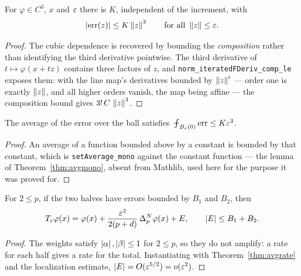\begin{theorem}\label{thm:cubicrate}
\leanok
For $\varphi \in C^3$, $x$ and $\varepsilon$ there is $K$, independent of the
increment, with
\[
  \left\lvert \mathrm{err}(z)\right\rvert \le K \left\lVert z\right\rVert^3
  \qquad\text{for all } \left\lVert z\right\rVert \le \varepsilon .
\]
\end{theorem}

\begin{proof}
\leanok
{}
The cubic dependence is recovered by bounding the \emph{composition} rather
than identifying the third derivative pointwise. The third derivative of
$t \mapsto \varphi(x+tz)$ contains three factors of $z$, and
\texttt{norm\_iteratedFDeriv\_comp\_le} exposes them: with the line map's
derivatives bounded by $\left\lVert z\right\rVert^i$ --- order one is exactly $\left\lVert z\right\rVert$, and
all higher orders vanish, the map being affine --- the composition bound gives
$3!\,C\,\left\lVert z\right\rVert^3$.
\end{proof}


\begin{theorem}\label{thm:avgrate}
\leanok
The average of the error over the ball satisfies
$\avgint_{B_\eps(0)} \mathrm{err} \le K\eps^3$.
\end{theorem}

\begin{proof}
\leanok
{}
An average of a function bounded above by a constant is bounded by that
constant, which is \texttt{setAverage\_mono} against the constant function
--- the lemma of Theorem~\ref{thm:avgmono}, absent from Mathlib, used here for
the purpose it was proved for.
\end{proof}


\begin{theorem}\label{thm:opbounded}
\leanok
For $2 \le p$, if the two halves have errors bounded by $B_1$ and $B_2$, then
\[
  T_\varepsilon\varphi(x) = \varphi(x)
    + \frac{\varepsilon^2}{2(p+d)}\,\Delta_p^{N}\varphi(x) + E ,
  \qquad \left\lvert E\right\rvert \le B_1 + B_2 .
\]
\end{theorem}

\begin{proof}
\leanok
{}
The weights satisfy $\left\lvert \alpha\right\rvert, \left\lvert \beta\right\rvert \le 1$ for $2 \le p$, so they do
not amplify: a rate for each half gives a rate for the total. Instantiating
with Theorem~\ref{thm:avgrate} and the localization estimate,
$\left\lvert E\right\rvert = O(\varepsilon^{5/2}) = o(\varepsilon^2)$.
\end{proof}


